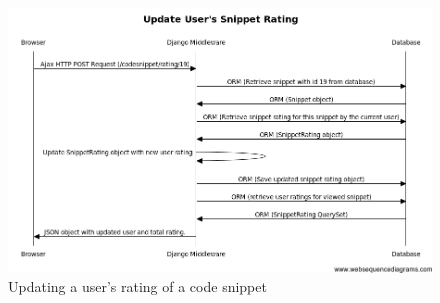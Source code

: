 \documentclass{sig-alt-release2}
\begin{document}
\begin{figure}
\centering
\includegraphics[scale=0.6]{../imgs/submitratingseqdiag.png}
\caption{Updating a user's rating of a code snippet}
\label{fig:ratingseqdiag}
\end{figure}
\end{document}

